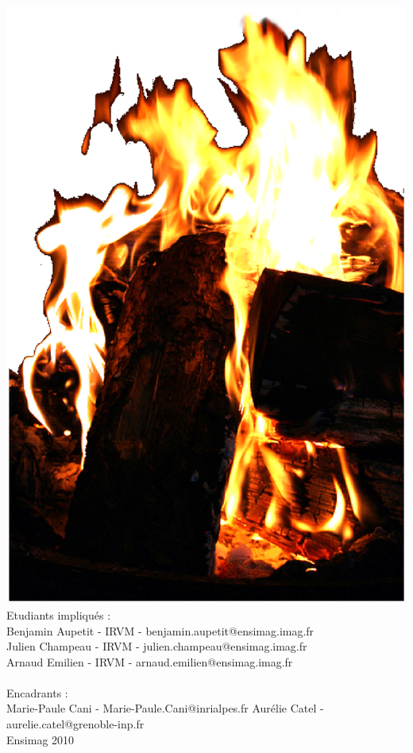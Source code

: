 \documentclass[a4paper,10pt]{article}
\begin{document}
\begin{center}
	\includegraphics[scale=0.3]{feu.ps}\\
	\vspace{2cm}
	Etudiants impliqués :\\
	Benjamin Aupetit - IRVM - benjamin.aupetit@ensimag.imag.fr\\
	Julien Champeau - IRVM - julien.champeau@ensimag.imag.fr\\
	Arnaud Emilien - IRVM - arnaud.emilien@ensimag.imag.fr\\
	~\\
	Encadrants :\\
	Marie-Paule Cani  -  Marie-Paule.Cani@inrialpes.fr 
	Aurélie Catel - aurelie.catel@grenoble-inp.fr
	~ \\
	\vspace{3mm}
	Ensimag 2010\\

\end{center}
\end{document}
